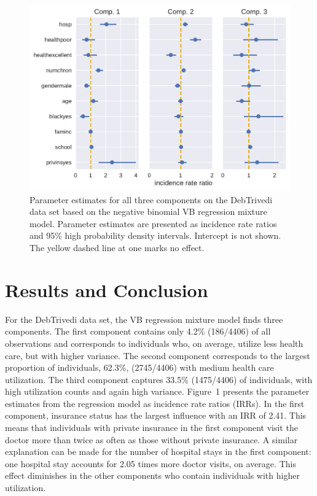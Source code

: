 \documentclass[a4paper,UKenglish]{oasics-v2016}
\begin{document}
\begin{figure}[!ht]\centering
	\includegraphics[width=\linewidth]{coefplot.pdf}
	\caption{\label{iter} Parameter estimates for all three components on the DebTrivedi data set based on the negative binomial VB regression mixture model. Parameter estimates are presented as incidence rate ratios and 95\% high probability density intervals. Intercept is not shown. The yellow dashed line at one marks no effect.}
\end{figure}

\section{Results and Conclusion}
For the DebTrivedi data set, the VB regression mixture model finds three components.
The first component contains only 4.2\% (186/4406) of all observations and corresponds to individuals who, on average, utilize less health care, but with higher variance. The second component corresponds to the largest proportion of individuals, 62.3\%, (2745/4406) with medium health care utilization. The third component captures 33.5\% (1475/4406) of individuals, with high utilization counts and again high variance. Figure~1 presents the parameter estimates from the regression model as incidence rate ratios (IRRs). In the first component, insurance status has the largest influence with an IRR of 2.41. This means that individuals with private insurance in the first component visit the doctor more than twice as often as those without private insurance. A similar explanation can be made for the number of hospital stays in the first component: one hospital stay accounts for 2.05 times more doctor visits, on average. This effect diminishes in the other components who contain individuals with higher utilization. 
\end{document}

